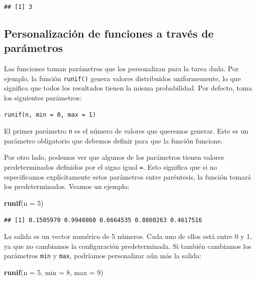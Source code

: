 \documentclass[
]{book}
\newenvironment{Shaded}{\begin{snugshade}}{\end{snugshade}}
\newcommand{\DataTypeTok}[1]{\textcolor[rgb]{0.13,0.29,0.53}{#1}}
\newcommand{\DecValTok}[1]{\textcolor[rgb]{0.00,0.00,0.81}{#1}}
\newcommand{\KeywordTok}[1]{\textcolor[rgb]{0.13,0.29,0.53}{\textbf{#1}}}
\newcommand{\NormalTok}[1]{#1}
\begin{document}
\begin{verbatim}
## [1] 3
\end{verbatim}

\hypertarget{personalizaciuxf3n-de-funciones-a-travuxe9s-de-paruxe1metros}{%
\subsection{Personalización de funciones a través de parámetros}\label{personalizaciuxf3n-de-funciones-a-travuxe9s-de-paruxe1metros}}

Las funciones toman parámetros que los personalizan para la tarea dada. Por ejemplo, la función \texttt{runif()} genera valores distribuidos uniformemente, lo que significa que todos los resultados tienen la misma probabilidad. Por defecto, toma los siguientes parámetros:

\begin{verbatim}
runif(n, min = 0, max = 1)
\end{verbatim}

El primer parámetro \texttt{n} es el número de valores que queremos generar. Este es un parámetro obligatorio que debemos definir para que la función funcione.

Por otro lado, podemos ver que algunos de los parámetros tienen valores predeterminados definidos por el signo igual \texttt{=}. Esto significa que si no especificamos explícitamente estos parámetros entre paréntesis, la función tomará los predeterminados. Veamos un ejemplo:

\begin{Shaded}
\begin{Highlighting}[]
\KeywordTok{runif}\NormalTok{(}\DataTypeTok{n =} \DecValTok{5}\NormalTok{)}
\end{Highlighting}
\end{Shaded}

\begin{verbatim}
## [1] 0.1505970 0.9940860 0.6664535 0.8860263 0.4617516
\end{verbatim}

La salida es un vector numérico de 5 números. Cada uno de ellos está entre 0 y 1, ya que no cambiamos la configuración predeterminada. Si también cambiamos los parámetros \texttt{min} y \texttt{max}, podríamos personalizar aún más la salida:

\begin{Shaded}
\begin{Highlighting}[]
\KeywordTok{runif}\NormalTok{(}\DataTypeTok{n =} \DecValTok{5}\NormalTok{, }\DataTypeTok{min =} \DecValTok{8}\NormalTok{, }\DataTypeTok{max =} \DecValTok{9}\NormalTok{)}
\end{Highlighting}
\end{Shaded}
\end{document}
